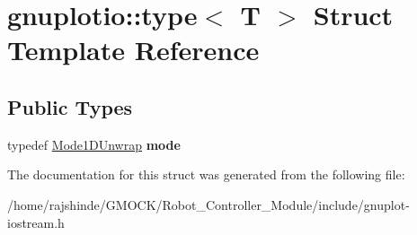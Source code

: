 \hypertarget{structgnuplotio_1_1_mode_auto_decoder_3_01_t_00_01typename_01boost_1_1enable__if__c_3_01_07_arra8faa7fb46cef74a29a23f22c000e4a99}{}\section{gnuplotio\+:\+:type$<$ T $>$ Struct Template Reference}
\label{structgnuplotio_1_1_mode_auto_decoder_3_01_t_00_01typename_01boost_1_1enable__if__c_3_01_07_arra8faa7fb46cef74a29a23f22c000e4a99}
\subsection*{Public Types}
\begin{DoxyCompactItemize}
\item 
typedef \hyperlink{structgnuplotio_1_1_mode1_d_unwrap}{Mode1\+D\+Unwrap} {\bfseries mode}\hypertarget{structgnuplotio_1_1_mode_auto_decoder_3_01_t_00_01typename_01boost_1_1enable__if__c_3_01_07_arra8faa7fb46cef74a29a23f22c000e4a99_a9c16f714b67e1c4b38e5c7ff956e8acc}{}\label{structgnuplotio_1_1_mode_auto_decoder_3_01_t_00_01typename_01boost_1_1enable__if__c_3_01_07_arra8faa7fb46cef74a29a23f22c000e4a99_a9c16f714b67e1c4b38e5c7ff956e8acc}

\end{DoxyCompactItemize}


The documentation for this struct was generated from the following file\+:\begin{DoxyCompactItemize}
\item 
/home/rajshinde/\+G\+M\+O\+C\+K/\+Robot\+\_\+\+Controller\+\_\+\+Module/include/gnuplot-\/iostream.\+h\end{DoxyCompactItemize}
